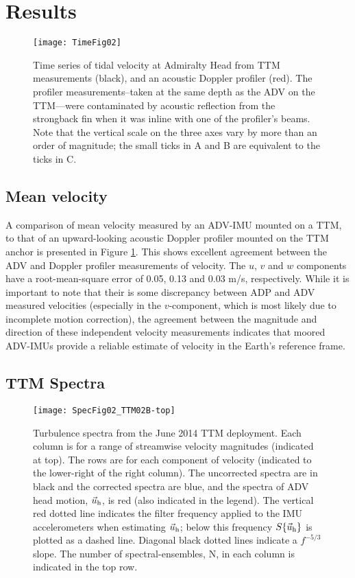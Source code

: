 \section{Results}

\begin{figure}[t]
  \centering
  \texttt{[image: TimeFig02]}
  \caption{Time series of tidal velocity at Admiralty Head from TTM measurements (black), and an acoustic Doppler profiler (red). The profiler measurements--taken at the same depth as the ADV on the TTM---were contaminated by acoustic reflection from the strongback fin when it was inline with one of the profiler's beams. Note that the vertical scale on the three axes vary by more than an order of magnitude; the small ticks in A and B are equivalent to the ticks in C.}
  \label{fig:vel_time}
\end{figure}

\subsection{Mean velocity}

A comparison of mean velocity measured by an ADV-IMU mounted on a TTM, to that of an upward-looking acoustic Doppler profiler mounted on the TTM anchor is presented in Figure \ref{fig:vel_time}. This shows excellent agreement between the ADV and Doppler profiler measurements of velocity. The $u$, $v$ and $w$ components have a root-mean-square error of 0.05, 0.13 and 0.03 m/s, respectively. While it is important to note that their is some discrepancy between ADP and ADV measured velocities (especially in the $v$-component, which is most likely due to incomplete motion correction), the agreement between the magnitude and direction of these independent velocity measurements indicates that moored ADV-IMUs provide a reliable estimate of velocity in the Earth's reference frame.

\subsection{TTM Spectra}

\begin{figure*}[t]
  \centering
  \texttt{[image: SpecFig02\_TTM02B-top]}
  \caption{Turbulence spectra from the June 2014 TTM deployment. Each column is for a range of streamwise velocity magnitudes (indicated at top). The rows are for each component of velocity (indicated to the lower-right of the right column). The uncorrected spectra are in black and the corrected spectra are blue, and the spectra of ADV head motion, $\vec{u}_\mathrm{h}$, is red (also indicated in the legend). The vertical red dotted line indicates the filter frequency applied to the IMU accelerometers when estimating $\vec{u}_\mathrm{h}$; below this frequency $S\{\vec{u}_\mathrm{h}\}$ is plotted as a dashed line.   Diagonal black dotted lines indicate a $f^{-5/3}$ slope. The number of spectral-ensembles, N, in each column is indicated in the top row.}
  \label{fig:spec:ttm}
\end{figure*}

